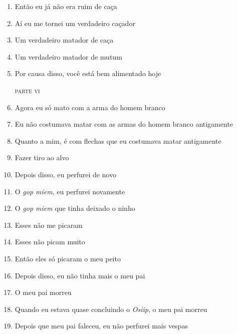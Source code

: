 \begin{enumerate}
 \begin{center}\end{center}
 
 \item Então eu já não era ruim de caça
 \item Aí eu me tornei um verdadeiro caçador
 \item Um verdadeiro matador de caça
 \item Um verdadeiro matador de mutum
 \item Por causa disso, você está bem alimentado hoje
 
 \begin{flushright}\textsc{parte vi}\end{flushright}
 
 \item Agora eu só mato com a arma do homem branco
 \item Eu não costumava matar com as armas do homem branco antigamente
 \item Quanto a mim, é com flechas que eu costumava matar antigamente
 \item Fazer tiro ao alvo
 
 \begin{center}\end{center}
 
 \item Depois disso, eu perfurei de novo
 \item O \textit{gop miem}, eu perfurei novamente
 \item O \textit{gop miem} que tinha deixado o ninho
 \item Esses não me picaram
 \item Esses não picam muito
 \item Então eles só picaram o meu peito
 
 \begin{center}\end{center}
 
 \item Depois disso, eu não tinha mais o meu pai
 \item O meu pai morreu
 \item Quando eu estava quase concluindo o \textit{Osiip}, o meu pai morreu
 \item Depois que meu pai faleceu, eu não perfurei mais vespas
 
 \begin{center}\end{center}
 

\end{enumerate}
